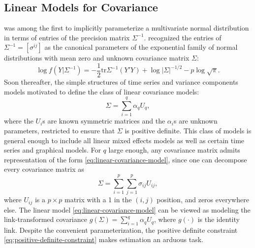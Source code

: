
\subsection{Linear Models for Covariance}
\cite{gabriel1962ante} was among the first to implicitly parameterize a multivariate normal distribution in terms of entries of the precision matrix $\Sigma^{-1}$.  \cite{dempster1972covariance} recognized the entries of $\Sigma^{-1} = \left[\sigma^{ij} \right]$ as the canonical parameters of the exponential family of normal distributions with mean zero and unknown covariance matrix $\Sigma$:
\[
\log f\left(Y \vert \Sigma^{-1}\right) = -\frac{1}{2}\mbox{tr}\Sigma^{-1} \left(Y'Y\right) + \log\vert \Sigma \vert^{-1/2} - p \log\sqrt{\pi}.
\]
Soon thereafter, the simple structures of time series and variance components models motivated \cite{anderson1973asymptotically} to define the class of linear covariance models:
\begin{equation}\label{eq:linear-covariance-model}
\Sigma = \sum_{i = 1}^q \alpha_qU_q,
\end{equation}
\noindent
where the $U_i$s are known symmetric matrices and the $\alpha_i$s are unknown parameters, restricted to ensure that $\Sigma$ is positive definite. This class of models is general enough to include all linear mixed effects models as well as certain time series and graphical models. For $q$ large enough, any covariance matrix admits representation of the form \eqref{eq:linear-covariance-model}, since one can decompose every covariance matrix as 
\begin{equation} \label{eq:linear-covariance-model-2}	
\Sigma = \sum_{i = 1}^p \sum_{j = 1}^p \sigma_{ij} U_{ij},
\end{equation}
\noindent
where $U_{ij}$ is a $p \times p$ matrix with a 1 in the $\left(i,j\right)$ position, and zeros everywhere else. The linear model \eqref{eq:linear-covariance-model} can be viewed as modeling the link-transformed covariance $g\left(\Sigma\right) =\sum_{i = 1}^q \alpha_qU_q$, where $g\left(\cdot\right)$ is the identity link. Despite the convenient parameterization, the positive definite constraint \eqref{eq:positive-definite-constraint} makes estimation an arduous task. 

\bigskip

